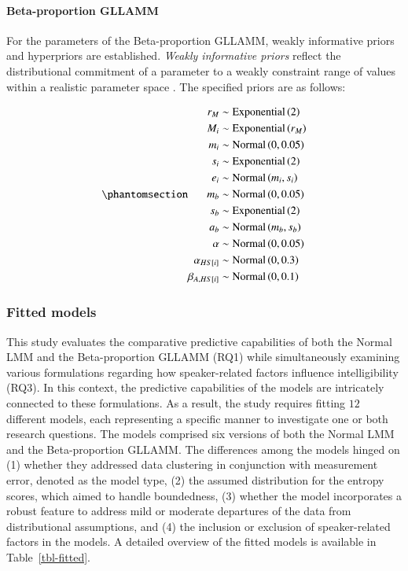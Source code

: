 \documentclass[
  authoryear,
  preprint,
  1p]{elsarticle}
\let\oldparagraph\paragraph
\renewcommand{\paragraph}[1]{\oldparagraph{#1}\mbox{}}
\begin{document}
\paragraph{Beta-proportion GLLAMM}\label{sec-M-SM-P-BGLLAMM}

For the parameters of the Beta-proportion GLLAMM, weakly informative
priors and hyperpriors are established. \emph{Weakly informative priors}
reflect the distributional commitment of a parameter to a weakly
constraint range of values within a realistic parameter space
\citep{McElreath_2020}. The specified priors are as follows:

\begin{equation}\phantomsection\label{eq-beta-GLLAMM-priors}{
\begin{aligned}
r_{M} &\sim \text{Exponential}\left( 2 \right) \\ 
M_{i} &\sim \text{Exponential}\left( r_{M} \right) \\
m_{i} &\sim \text{Normal} \left( 0, 0.05 \right) \\
s_{i} &\sim \text{Exponential} \left( 2 \right) \\
e_{i} &\sim \text{Normal} \left( m_{i}, s_{i} \right) \\
m_{b} &\sim \text{Normal} \left( 0, 0.05 \right) \\
s_{b} &\sim \text{Exponential} \left( 2 \right) \\
a_{b} &\sim \text{Normal} \left( m_{b}, s_{b} \right) \\
\alpha &\sim \text{Normal} \left( 0, 0.05 \right) \\
\alpha_{HS[i]} &\sim \text{Normal} \left( 0, 0.3 \right) \\
\beta_{A,HS[i]} &\sim \text{Normal} \left( 0, 0.1 \right)
\end{aligned} 
}\end{equation}

\subsubsection{Fitted models}\label{sec-M-SM-FM}

This study evaluates the comparative predictive capabilities of both the
Normal LMM and the Beta-proportion GLLAMM (RQ1) while simultaneously
examining various formulations regarding how speaker-related factors
influence intelligibility (RQ3). In this context, the predictive
capabilities of the models are intricately connected to these
formulations. As a result, the study requires fitting \(12\) different
models, each representing a specific manner to investigate one or both
research questions. The models comprised six versions of both the Normal
LMM and the Beta-proportion GLLAMM. The differences among the models
hinged on (1) whether they addressed data clustering in conjunction with
measurement error, denoted as the model type, (2) the assumed
distribution for the entropy scores, which aimed to handle boundedness,
(3) whether the model incorporates a robust feature to address mild or
moderate departures of the data from distributional assumptions, and (4)
the inclusion or exclusion of speaker-related factors in the models. A
detailed overview of the fitted models is available in
Table~\ref{tbl-fitted}.
\end{document}
